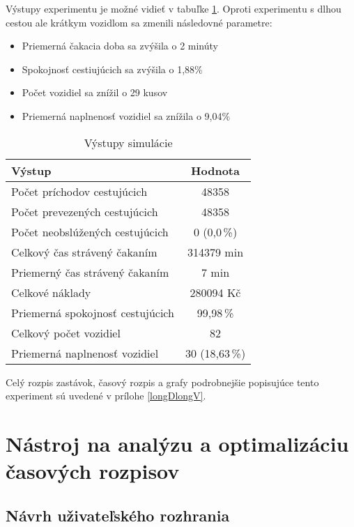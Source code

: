 Výstupy experimentu je možné vidieť v tabuľke \ref{tab:longDlongVout}.
Oproti experimentu s dlhou cestou ale krátkym vozidlom sa zmenili následovné parametre:
\begin{itemize}
  \item Priemerná čakacia doba sa zvýšila o 2 minúty
  \item Spokojnosť cestiujúcich sa zvýšila o 1,88\%
  \item Počet vozidiel sa znížil o 29 kusov
  \item Priemerná naplnenosť vozidiel sa znížila o 9,04\%
\end{itemize}

\begin{table}[h]
  \centering
  \begin{tabular}{|l|c|}
    \hline
      \textbf{Výstup} & \textbf{Hodnota} \\ \hline
        Počet príchodov cestujúcich & 48358 \\ \hline
          Počet prevezených cestujúcich & 48358 \\ \hline
          Počet neobslúžených cestujúcich & 0 (0,0\,\%) \\ \hline
          Celkový čas strávený čakaním & 314379 min \\ \hline
          Priemerný čas strávený čakaním & 7 min \\ \hline
          Celkové náklady & 280094 Kč \\ \hline
          Priemerná spokojnosť cestujúcich & 99,98\,\% \\ \hline
          Celkový počet vozidiel & 82 \\ \hline
          Priemerná naplnenosť vozidiel & 30 (18,63\,\%) \\ \hline
  \end{tabular}
  \caption{Výstupy simulácie}
  \label{tab:longDlongVout}
\end{table}

Celý rozpis zastávok, časový rozpis a grafy podrobnejšie popisujúce tento experiment sú uvedené v prílohe \ref{longDlongV}.

\chapter{Nástroj na analýzu a optimalizáciu časových rozpisov}
\label{nastroj}

\section{Návrh uživateľského rozhrania}
\label{nastroj_uzivatelske_rozhranie}

